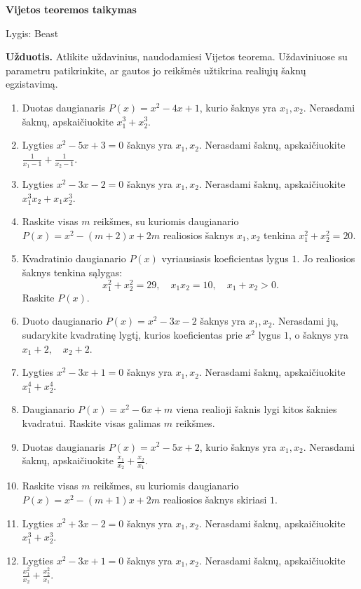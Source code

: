 \documentclass[11pt,a4paper]{article}
\begin{document}
\begin{center}
{\Large\bfseries Vijetos teoremos taikymas}

\medskip
{\large Lygis: Beast}

\end{center}
\textbf{Užduotis.} Atlikite uždavinius, naudodamiesi Vijetos teorema.
Uždaviniuose su parametru patikrinkite, ar gautos jo reikšmės užtikrina
realiųjų šaknų egzistavimą.
\medskip
\begin{enumerate}
\item Duotas daugianaris \(P(x)=x^2-4x+1\), kurio šaknys yra \(x_1,x_2\). Nerasdami šaknų, apskaičiuokite \mbox{\(x_1^3+x_2^3\)}.
\item Lygties \(x^2-5x+3=0\) šaknys yra \(x_1,x_2\). Nerasdami šaknų, apskaičiuokite \mbox{\(\frac1{x_1-1}+\frac1{x_2-1}\)}.
\item Lygties \(x^2-3x-2=0\) šaknys yra \(x_1,x_2\). Nerasdami šaknų, apskaičiuokite \mbox{\(x_1^3x_2+x_1x_2^3\)}.
\item Raskite visas \(m\) reikšmes, su kuriomis daugianario \(P(x)=x^2-(m+2)x+2m\) realiosios šaknys \(x_1,x_2\) tenkina \mbox{\(x_1^2+x_2^2=20\)}.
\item \begin{minipage}[t]{\linewidth}Kvadratinio daugianario \(P(x)\) vyriausiasis koeficientas lygus \(1\). Jo realiosios šaknys tenkina sąlygas: \[x_1^2+x_2^2=29,\quad x_1x_2=10,\quad x_1+x_2>0.\] Raskite \(P(x)\).\end{minipage}
\item Duoto daugianario \(P(x)=x^2-3x-2\) šaknys yra \(x_1,x_2\). Nerasdami jų, sudarykite kvadratinę lygtį, kurios koeficientas prie \(x^2\) lygus \(1\), o šaknys yra \mbox{\(x_1+2,\quad x_2+2\)}.
\item Lygties \(x^2-3x+1=0\) šaknys yra \(x_1,x_2\). Nerasdami šaknų, apskaičiuokite \mbox{\(x_1^4+x_2^4\)}.
\item Daugianario \(P(x)=x^2-6x+m\) viena realioji šaknis lygi kitos šaknies kvadratui. Raskite visas galimas \(m\) reikšmes.
\item Duotas daugianaris \(P(x)=x^2-5x+2\), kurio šaknys yra \(x_1,x_2\). Nerasdami šaknų, apskaičiuokite \mbox{\(\frac{x_1}{x_2}+\frac{x_2}{x_1}\)}.
\item Raskite visas \(m\) reikšmes, su kuriomis daugianario \(P(x)=x^2-(m+1)x+2m\) realiosios šaknys skiriasi \(1\).
\item Lygties \(x^2+3x-2=0\) šaknys yra \(x_1,x_2\). Nerasdami šaknų, apskaičiuokite \mbox{\(x_1^3+x_2^3\)}.
\item Lygties \(x^2-3x+1=0\) šaknys yra \(x_1,x_2\). Nerasdami šaknų, apskaičiuokite \mbox{\(\frac{x_1^2}{x_2}+\frac{x_2^2}{x_1}\)}.

\end{enumerate}
\end{document}
